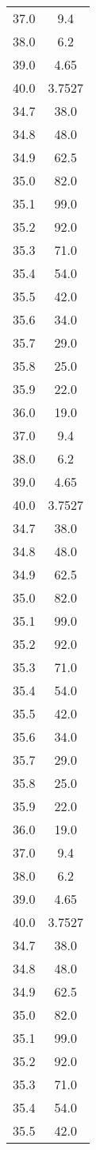 \begin{table}
\begin{tabular}{S[]S[]}
37.0 & 9.4\\
38.0 & 6.2\\
39.0 & 4.65\\
40.0 & 3.7527\\
34.7 & 38.0\\
34.8 & 48.0\\
34.9 & 62.5\\
35.0 & 82.0\\
35.1 & 99.0\\
35.2 & 92.0\\
35.3 & 71.0\\
35.4 & 54.0\\
35.5 & 42.0\\
35.6 & 34.0\\
35.7 & 29.0\\
35.8 & 25.0\\
35.9 & 22.0\\
36.0 & 19.0\\
37.0 & 9.4\\
38.0 & 6.2\\
39.0 & 4.65\\
40.0 & 3.7527\\
34.7 & 38.0\\
34.8 & 48.0\\
34.9 & 62.5\\
35.0 & 82.0\\
35.1 & 99.0\\
35.2 & 92.0\\
35.3 & 71.0\\
35.4 & 54.0\\
35.5 & 42.0\\
35.6 & 34.0\\
35.7 & 29.0\\
35.8 & 25.0\\
35.9 & 22.0\\
36.0 & 19.0\\
37.0 & 9.4\\
38.0 & 6.2\\
39.0 & 4.65\\
40.0 & 3.7527\\
34.7 & 38.0\\
34.8 & 48.0\\
34.9 & 62.5\\
35.0 & 82.0\\
35.1 & 99.0\\
35.2 & 92.0\\
35.3 & 71.0\\
35.4 & 54.0\\
35.5 & 42.0\\

\end{tabular}
\end{table}
